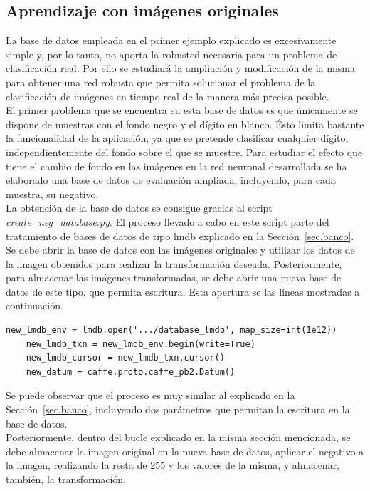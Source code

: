 \subsection{Aprendizaje con imágenes originales}
La base de datos empleada en el primer ejemplo explicado es excesivamente simple y, por lo tanto, no aporta la robusted necesaria para un problema de clasificación real. Por ello se estudiará la ampliación y modificación de la misma para obtener una red robusta que permita solucionar el problema de la clasificación de imágenes en tiempo real de la manera más precisa posible.\\

El primer problema que se encuentra en esta base de datos es que únicamente se dispone de muestras con el fondo negro y el dígito en blanco. Ésto limita bastante la funcionalidad de la aplicación, ya que se pretende clasificar cualquier dígito, independientemente del fondo sobre el que se muestre. Para estudiar el efecto que tiene el cambio de fondo en las imágenes en la red neuronal desarrollada se ha elaborado una base de datos de evaluación ampliada, incluyendo, para cada muestra, su negativo.\\

La obtención de la base de datos se consigue gracias al script \textit{create\_neg\_database.py}. El proceso llevado a cabo en este script parte del tratamiento de bases de datos de tipo \acrshort{lmdb} explicado en la Sección~\ref{sec.banco}. Se debe abrir la base de datos con las imágenes originales y utilizar los datos de la imagen obtenidos para realizar la transformación deseada. Posteriormente, para almacenar las imágenes transformadas, se debe abrir una nueva base de datos de este tipo, que permita escritura. Esta apertura se las líneas mostradas a continuación.
\vspace{10pt}
\begin{lstlisting}[frame=single]
	new_lmdb_env = lmdb.open('.../database_lmdb', map_size=int(1e12))
	new_lmdb_txn = new_lmdb_env.begin(write=True)
	new_lmdb_cursor = new_lmdb_txn.cursor()
	new_datum = caffe.proto.caffe_pb2.Datum()
	\end{lstlisting}

Se puede observar que el proceso es muy similar al explicado en la Sección~\ref{sec.banco}, incluyendo dos parámetros que permitan la escritura en la base de datos.\\

Posteriormente, dentro del bucle explicado en la misma sección mencionada, se debe almacenar la imagen original en la nueva base de datos, aplicar el negativo a la imagen, realizando la resta de 255 y los valores de la misma, y almacenar, también, la transformación.\\

